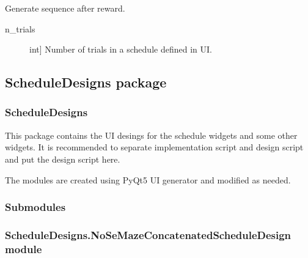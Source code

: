 \documentclass[letterpaper,10pt,english]{sphinxmanual}
\begin{document}

\begin{fulllineitems}
\label{\detokenize{NoSeMazeSchedule/Generation:Generation.Gen.reward_sequence}}
\pysigstartsignatures
{}
\pysigstopsignatures
\sphinxAtStartPar
Generate sequence after reward.
\begin{description}
\item[{n\_trials}] \leavevmode{[}int{]}
\sphinxAtStartPar
Number of trials in a schedule defined in UI.

\end{description}

\end{fulllineitems}


\sphinxstepscope


\subsection{ScheduleDesigns package}
\label{\detokenize{NoSeMazeSchedule/ScheduleDesigns:scheduledesigns-package}}\label{\detokenize{NoSeMazeSchedule/ScheduleDesigns::doc}}

\subsubsection{ScheduleDesigns}
\label{\detokenize{NoSeMazeSchedule/ScheduleDesigns:scheduledesigns}}
\sphinxAtStartPar
This package contains the UI desings for the schedule widgets and some other widgets. It is recommended to separate implementation script and design script and put the design script here.

\sphinxAtStartPar
The modules are created using PyQt5 UI generator and modified as needed.


\subsubsection{Submodules}
\label{\detokenize{NoSeMazeSchedule/ScheduleDesigns:submodules}}

\subsubsection{ScheduleDesigns.NoSeMazeConcatenatedScheduleDesign module}
\label{\detokenize{NoSeMazeSchedule/ScheduleDesigns:module-ScheduleDesigns.NoSeMazeConcatenatedScheduleDesign}}\label{\detokenize{NoSeMazeSchedule/ScheduleDesigns:scheduledesigns-nosemazeconcatenatedscheduledesign-module}}
\end{document}

